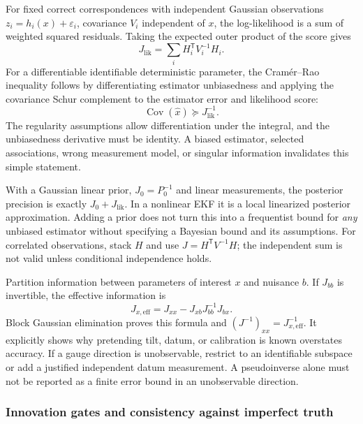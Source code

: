 \documentclass[11pt,a4paper]{article}
\numberwithin{equation}{section}
\begin{document}
For fixed correct correspondences with independent Gaussian observations
$z_i=h_i(x)+\varepsilon_i$, covariance $V_i$ independent of $x$, the
log-likelihood is a sum of weighted squared residuals. Taking the
expected outer product of the score gives
\begin{equation}
 J_{\mathrm{lik}}=\sum_i H_i^{\mathsf T}V_i^{-1}H_i.
\end{equation}
For a differentiable identifiable deterministic parameter, the
Cram\'er--Rao inequality follows by differentiating estimator
unbiasedness and applying the covariance Schur complement to the
estimator error and likelihood score:
\begin{equation}
 \operatorname{Cov}(\widehat x)\succeq J_{\mathrm{lik}}^{-1}.
\end{equation}
The regularity assumptions allow differentiation under the integral,
and the unbiasedness derivative must be identity. A biased estimator,
selected associations, wrong measurement model, or singular information
invalidates this simple statement.

With a Gaussian linear prior, $J_0=P_0^{-1}$ and linear measurements,
the posterior precision is exactly $J_0+J_{\mathrm{lik}}$. In a nonlinear
EKF it is a local linearized posterior approximation. Adding a prior
does not turn this into a frequentist bound for \emph{any} unbiased
estimator without specifying a Bayesian bound and its assumptions.
For correlated observations, stack $H$ and use $J=H^{\mathsf T}V^{-1}H$;
the independent sum is not valid unless conditional independence holds.

Partition information between parameters of interest $x$ and nuisance
$b$. If $J_{bb}$ is invertible, the effective information is
\begin{equation}
 J_{x,\mathrm{eff}}=J_{xx}-J_{xb}J_{bb}^{-1}J_{bx}.
\end{equation}
Block Gaussian elimination proves this formula and
$(J^{-1})_{xx}=J_{x,\mathrm{eff}}^{-1}$. It explicitly shows why
pretending tilt, datum, or calibration is known overstates accuracy.
If a gauge direction is unobservable, restrict to an identifiable
subspace or add a justified independent datum measurement. A
pseudoinverse alone must not be reported as a finite error bound in an
unobservable direction.

\subsubsection{Innovation gates and consistency against imperfect truth}
\end{document}

